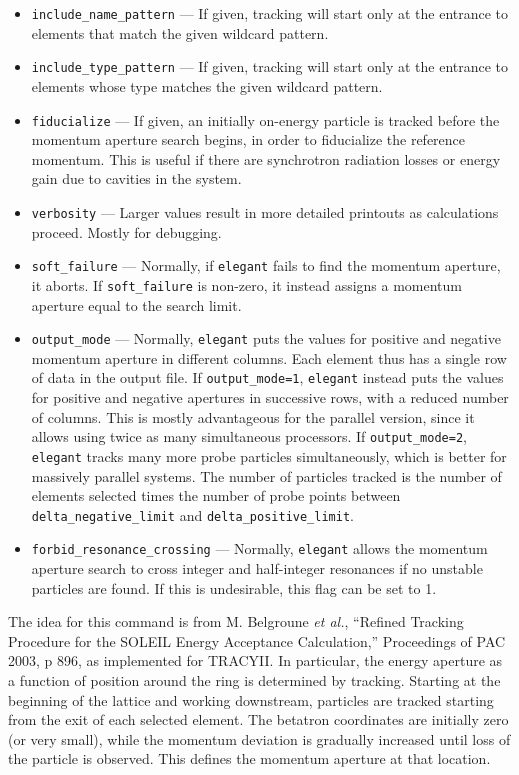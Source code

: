 \documentclass[11pt]{article}
\begin{document}
\begin{itemize}
\item \verb|include_name_pattern| --- If given, tracking will start
only at the entrance to elements that match the given wildcard
pattern.

\item \verb|include_type_pattern| --- If given, tracking will start
only at the entrance to elements whose type matches the given wildcard
pattern.

\item \verb|fiducialize| --- If given, an initially on-energy particle is tracked before
 the momentum aperture search begins, in order to fiducialize the reference momentum.
 This is useful if there are synchrotron radiation losses or energy gain due to cavities
 in the system.

\item \verb|verbosity| --- Larger values result in more detailed
printouts as calculations proceed.  Mostly for debugging.

\item \verb|soft_failure| --- Normally, if {\tt elegant} fails to find the momentum aperture,
it aborts.  If \verb|soft_failure| is non-zero, it instead assigns a momentum aperture equal
to the search limit.

\item \verb|output_mode| --- Normally, {\tt elegant} puts the values for positive and
negative momentum aperture in different columns.  Each element thus has a single row of
data in the output file.  If \verb|output_mode=1|, {\tt elegant} instead puts
the values for positive and negative apertures in successive rows, with a reduced number
of columns.  This is mostly advantageous for the parallel version, since it allows using
twice as many simultaneous processors.
If \verb|output_mode=2|, {\tt elegant} tracks many more probe particles simultaneously, which
is better for massively parallel systems. The number of particles tracked is the number of
elements selected times the number of probe points between  \verb|delta_negative_limit| and \verb|delta_positive_limit|.

\item \verb|forbid_resonance_crossing| --- Normally, {\tt elegant} allows the momentum
aperture search to cross integer and half-integer resonances if no unstable particles are
found.  If this is undesirable, this flag can be set to 1.
\end{itemize}

The idea for this command is from M. Belgroune {\em et al.}, ``Refined
Tracking Procedure for the SOLEIL Energy Acceptance Calculation,''
Proceedings of PAC 2003, p 896, as implemented for TRACYII.  In
particular, the energy aperture as a function of position around the
ring is determined by tracking.  Starting at the beginning of the
lattice and working downstream, particles are tracked starting from
the exit of each selected element.  The betatron coordinates are
initially zero (or very small), while the momentum deviation is
gradually increased until loss of the particle is observed.  This
defines the momentum aperture at that location.
\end{document}
